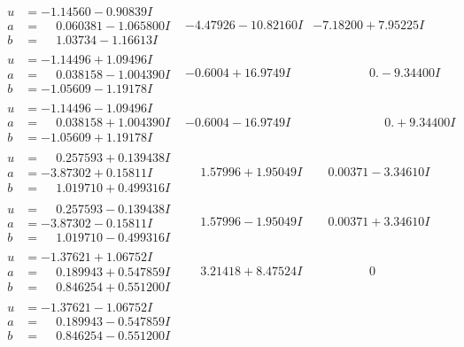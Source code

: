 \documentclass[1p]{elsarticle_modified}
\theoremstyle{definition}
\begin{document}
$$\begin{array}{c|c|c}
\begin{aligned}
u &= -1.14560 - 0.90839 I \\
a &= \phantom{-}0.060381 - 1.065800 I \\
b &= \phantom{-}1.03734 - 1.16613 I\end{aligned}
 & -4.47926 - 10.82160 I & -7.18200 + 7.95225 I \\ \hline\begin{aligned}
u &= -1.14496 + 1.09496 I \\
a &= \phantom{-}0.038158 - 1.004390 I \\
b &= -1.05609 - 1.19178 I\end{aligned}
 & -0.6004 + 16.9749 I & \phantom{-0.000000 } 0. - 9.34400 I \\ \hline\begin{aligned}
u &= -1.14496 - 1.09496 I \\
a &= \phantom{-}0.038158 + 1.004390 I \\
b &= -1.05609 + 1.19178 I\end{aligned}
 & -0.6004 - 16.9749 I & \phantom{-0.000000 -}0. + 9.34400 I \\ \hline\begin{aligned}
u &= \phantom{-}0.257593 + 0.139438 I \\
a &= -3.87302 + 0.15811 I \\
b &= \phantom{-}1.019710 + 0.499316 I\end{aligned}
 & \phantom{-}1.57996 + 1.95049 I & \phantom{-}0.00371 - 3.34610 I \\ \hline\begin{aligned}
u &= \phantom{-}0.257593 - 0.139438 I \\
a &= -3.87302 - 0.15811 I \\
b &= \phantom{-}1.019710 - 0.499316 I\end{aligned}
 & \phantom{-}1.57996 - 1.95049 I & \phantom{-}0.00371 + 3.34610 I \\ \hline\begin{aligned}
u &= -1.37621 + 1.06752 I \\
a &= \phantom{-}0.189943 + 0.547859 I \\
b &= \phantom{-}0.846254 + 0.551200 I\end{aligned}
 & \phantom{-}3.21418 + 8.47524 I & \phantom{-0.000000 } 0 \\ \hline\begin{aligned}
u &= -1.37621 - 1.06752 I \\
a &= \phantom{-}0.189943 - 0.547859 I \\
b &= \phantom{-}0.846254 - 0.551200 I\end{aligned}

\end{array}$$
\end{document}
